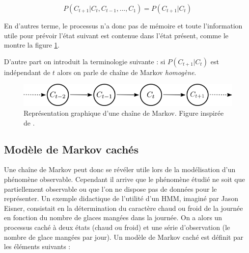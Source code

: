 \documentclass[12pt]{report}
\begin{document}
\begin{equation}
P\left( C_{t+1} | C_t,C_{t-1},...,C_1  \right) = P\left( C_{t+1} | C_t  \right)
\label{eq::HMM:MarkovProcess}
\end{equation}

En d'autres terme, le processus n'a donc pas de mémoire et toute l'information utile pour prévoir l'état suivant est contenue dans l'état présent, comme le montre la figure \ref{fig::HMM:MarkovChain}.

D'autre part on introduit la terminologie suivante : si $P\left( C_{t+1} | C_t  \right)$ est indépendant de $t$ alors on parle de chaîne de Markov \textit{homogène}.

\begin{figure}[ht]
	\begin{center}
		\includegraphics[width=\textwidth]{Images/Models/HMM/ChaineMarkov.png}
		\caption{Représentation graphique d'une chaîne de Markov. Figure inspirée de \cite{zucchini_hidden_2017}.}
		\label{fig::HMM:MarkovChain}
	\end{center}
\end{figure}

\subsection{Modèle de Markov cachés}
\label{subsec:Modeles_HMM}
Une chaîne de Markov peut donc se révéler utile lors de la modélisation d'un phénomène observable. Cependant il arrive que le phénomène étudié ne soit que partiellement observable ou que l'on ne dispose pas de données pour le représenter. Un exemple didactique de l'utilité d'un HMM, imaginé par Jason Eisner, consistait en la détermination du caractère chaud ou froid de la journée en fonction du nombre de glaces mangées dans la journée. On a alors un processus caché à deux états (chaud ou froid) et une série d'observation (le nombre de glace mangées par jour). Un modèle de Markov caché est définit par les éléments suivants :
\end{document}
